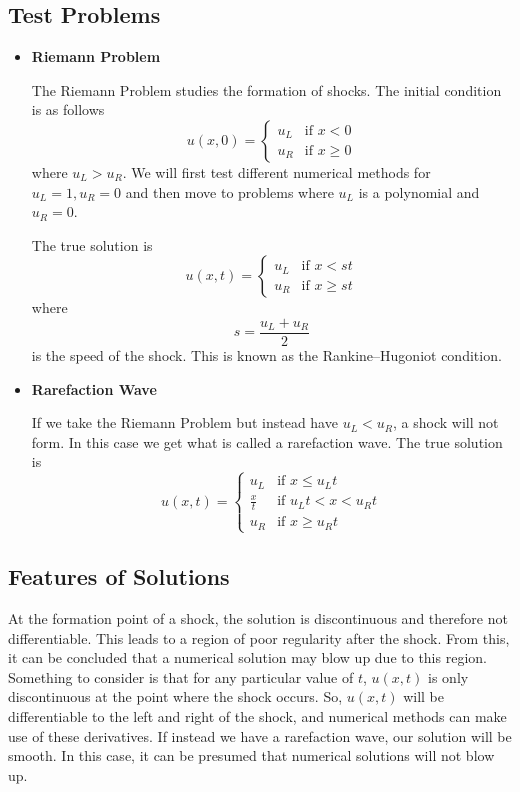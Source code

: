 \documentclass{myproject}
\begin{document}
\subsection{Test Problems}
\begin{itemize}
	\item \textbf{Riemann Problem}
	
    The Riemann Problem studies the formation of shocks. The initial condition is as follows
	\begin{equation}
		u(x,0) = 
	    \begin{cases}
	      	u_L & \text{if } x < 0 \\
			u_R & \text{if } x \geq 0
	    \end{cases}
	\end{equation}
	where $u_L > u_R$. We will first test different numerical methods for $u_L = 1, u_R = 0$ and then move to problems where $u_L$ is a polynomial and $u_R = 0$.
	
    The true solution is
	\begin{equation}
		u(x,t) = 
	    \begin{cases}
	      	u_L & \text{if } x < st \\
			u_R & \text{if } x \geq st
	    \end{cases}
	\end{equation}
	where \[s = \frac{u_L + u_R}{2}\] is the speed of the shock. This is known as the Rankine–Hugoniot condition.
	
	\item \textbf{Rarefaction Wave}
	
    If we take the Riemann Problem but instead have $u_L < u_R$, a shock will not form. In this case we get what is called a rarefaction wave.
	The true solution is
	\begin{equation}
		u(x,t) = 
	    \begin{cases}
	      	u_L & \text{if } x \leq {u_L}t \\
			\frac{x}{t} & \text{if } {u_L}t < x < {u_R}t \\
			u_R & \text{if } x \geq {u_R}t
	    \end{cases}
	\end{equation}
\end{itemize}

\subsection{Features of Solutions}
At the formation point of a shock, the solution is discontinuous and therefore not differentiable. This leads to a region of poor regularity after the shock. From this, it can be concluded that a numerical solution may blow up due to this region. Something to consider is that for any particular value of $t$, $u(x, t)$ is only discontinuous at the point where the shock occurs. So, $u(x,t)$ will be differentiable to the left and right of the shock, and numerical methods can make use of these derivatives. If instead we have a rarefaction wave, our solution will be smooth. In this case, it can be presumed that numerical solutions will not blow up.
\end{document}
